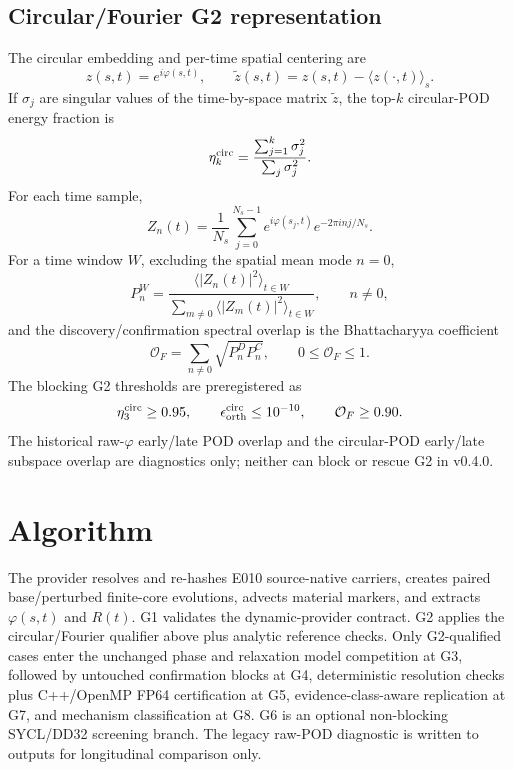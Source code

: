 \documentclass[11pt,a4paper]{article}
\begin{document}
\subsection{Circular/Fourier G2 representation}
The circular embedding and per-time spatial centering are
\begin{equation}
z(s,t)=e^{i\varphi(s,t)},\qquad \widetilde z(s,t)=z(s,t)-\langle z(\cdot,t)\rangle_s.
\end{equation}
If $\sigma_j$ are singular values of the time-by-space matrix $\widetilde z$, the top-$k$ circular-POD energy fraction is
\begin{equation}
\eta_k^{\rm circ}=\frac{\sum_{j=1}^{k}\sigma_j^2}{\sum_j\sigma_j^2}.
\end{equation}
For each time sample,
\begin{equation}
Z_n(t)=\frac{1}{N_s}\sum_{j=0}^{N_s-1}e^{i\varphi(s_j,t)}e^{-2\pi i n j/N_s}.
\end{equation}
For a time window $W$, excluding the spatial mean mode $n=0$,
\begin{equation}
P_n^W=\frac{\langle |Z_n(t)|^2\rangle_{t\in W}}
{\sum_{m\ne0}\langle |Z_m(t)|^2\rangle_{t\in W}},\qquad n\ne0,
\end{equation}
and the discovery/confirmation spectral overlap is the Bhattacharyya coefficient
\begin{equation}
\mathcal O_F=\sum_{n\ne0}\sqrt{P_n^{D}P_n^{C}},\qquad 0\le\mathcal O_F\le1.
\end{equation}
The blocking G2 thresholds are preregistered as
\begin{equation}
\eta_3^{\rm circ}\ge0.95,\qquad
\epsilon_{\rm orth}^{\rm circ}\le10^{-10},\qquad
\mathcal O_F\ge0.90.
\end{equation}
The historical raw-$\varphi$ early/late POD overlap and the circular-POD early/late subspace overlap are diagnostics only; neither can block or rescue G2 in v0.4.0.

\section{Algorithm}
The provider resolves and re-hashes E010 source-native carriers, creates paired base/perturbed finite-core evolutions, advects material markers, and extracts $\varphi(s,t)$ and $R(t)$. G1 validates the dynamic-provider contract. G2 applies the circular/Fourier qualifier above plus analytic reference checks. Only G2-qualified cases enter the unchanged phase and relaxation model competition at G3, followed by untouched confirmation blocks at G4, deterministic resolution checks plus C++/OpenMP FP64 certification at G5, evidence-class-aware replication at G7, and mechanism classification at G8. G6 is an optional non-blocking SYCL/DD32 screening branch. The legacy raw-POD diagnostic is written to outputs for longitudinal comparison only.
\end{document}
